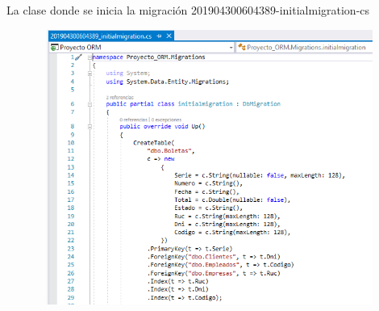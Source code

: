 \documentclass[12pt,a4paper,oneside]{book}
\begin{document}
\begin{enumerate}
\begin{enumerate}
\begin{enumerate}
					\newpage
							La clase donde se inicia la migraci\'on 201904300604389-initialmigration-cs  \\
							
								\begin{figure}[htb]
									\centering \includegraphics[width=12cm, height=9cm]{img/Migraciones/4clasemigra.png}
								\end{figure}
								

\end{enumerate}
\end{enumerate}
\end{enumerate}
\end{document}
